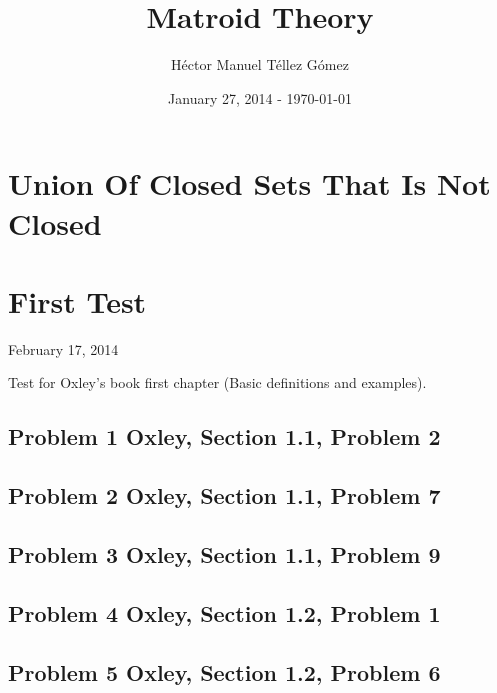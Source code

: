 \frontmatter
\title{Matroid Theory}
\author{Héctor Manuel Téllez Gómez}
\date{January 27, 2014 - \today}
\maketitle

\tableofcontents

\mainmatter


\chapter{Union Of Closed Sets That Is Not Closed}


\chapter{First Test}
    \begin{center} February 17, 2014 \end{center}
    Test for Oxley's book first chapter (Basic definitions and examples). 
    
    \section{Problem 1 Oxley, Section 1.1, Problem 2}
        

    \section{Problem 2 Oxley, Section 1.1, Problem 7}
        

    \section{Problem 3 Oxley, Section 1.1, Problem 9}
        

    \section{Problem 4 Oxley, Section 1.2, Problem 1}
        

    \section{Problem 5 Oxley, Section 1.2, Problem 6}
        


